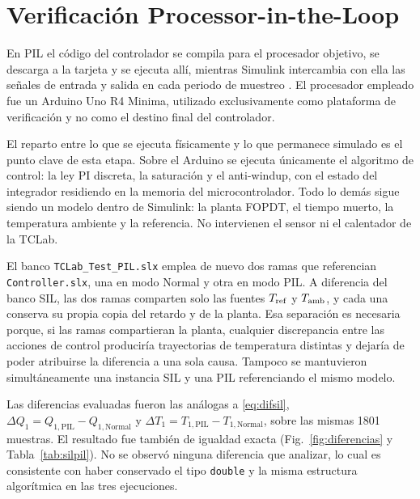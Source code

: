 \section{Verificación Processor-in-the-Loop}

En PIL el código del controlador se compila para el procesador objetivo, se descarga a la tarjeta y
se ejecuta allí, mientras Simulink intercambia con ella las señales de entrada y salida en cada
periodo de muestreo \cite{mw_pil}. El procesador empleado fue un Arduino Uno R4 Minima, utilizado
exclusivamente como plataforma de verificación y no como el destino final del controlador.

El reparto entre lo que se ejecuta físicamente y lo que permanece simulado es el punto clave de esta
etapa. Sobre el Arduino se ejecuta únicamente el algoritmo de control: la ley PI discreta, la
saturación y el anti-windup, con el estado del integrador residiendo en la memoria del
microcontrolador. Todo lo demás sigue siendo un modelo dentro de Simulink: la planta FOPDT, el
tiempo muerto, la temperatura ambiente y la referencia. No intervienen el sensor ni el calentador de
la TCLab.

El banco \texttt{TCLab\_Test\_PIL.slx} emplea de nuevo dos ramas que referencian
\texttt{Controller.slx}, una en modo Normal y otra en modo PIL. A diferencia del banco SIL, las dos
ramas comparten solo las fuentes $T_{\mathrm{ref}}$ y $T_{\mathrm{amb}}$, y cada una conserva su propia copia del retardo
y de la planta. Esa separación es necesaria porque, si las ramas compartieran la planta, cualquier
discrepancia entre las acciones de control produciría trayectorias de temperatura distintas y
dejaría de poder atribuirse la diferencia a una sola causa. Tampoco se mantuvieron simultáneamente
una instancia SIL y una PIL referenciando el mismo modelo.

Las diferencias evaluadas fueron las análogas a \eqref{eq:difsil},
$\Delta Q_1 = Q_{1,\mathrm{PIL}} - Q_{1,\mathrm{Normal}}$ y
$\Delta T_1 = T_{1,\mathrm{PIL}} - T_{1,\mathrm{Normal}}$, sobre las mismas \num{1801} muestras. El
resultado fue también de igualdad exacta (Fig.~\ref{fig:diferencias} y Tabla~\ref{tab:silpil}). No
se observó ninguna diferencia que analizar, lo cual es consistente con haber conservado el tipo
\texttt{double} y la misma estructura algorítmica en las tres ejecuciones.

